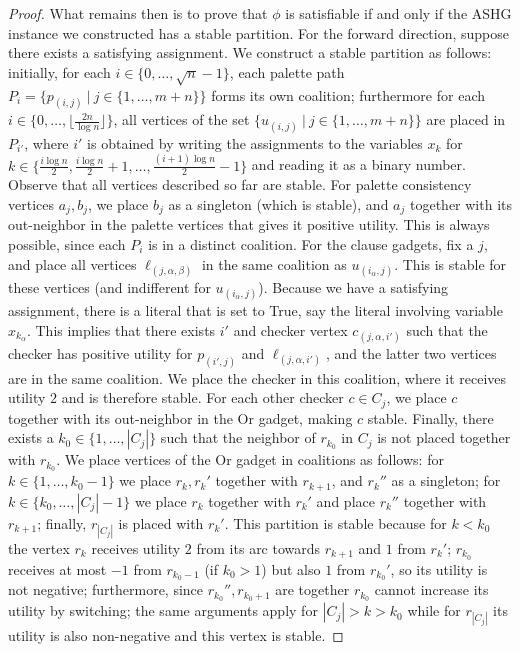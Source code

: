 \documentclass[letterpaper,USenglish,cleveref, autoref, thm-restate]{lipics-v2021}
\begin{document}
\begin{proof}
What remains then is to prove that $\phi$ is satisfiable if and only if the
ASHG instance we constructed has a stable partition. For the forward direction,
suppose there exists a satisfying assignment. We construct a stable partition
as follows: initially, for each $i\in\{0,\ldots,\sqrt{n}-1\}$, each palette
path $P_i = \{ p_{(i,j)}\ |\ j\in\{1,\ldots,m+n\}\}$ forms its own coalition;
furthermore for each $i\in\{0,\ldots,\lfloor\frac{2n}{\log n}\rfloor\}$, all
vertices of the set $\{ u_{(i,j)}\ |\ j\in\{1,\ldots,m+n\}\}$ are placed in
$P_{i'}$, where $i'$ is obtained by writing the assignments to the variables
$x_k$ for $k\in\{\frac{i\log n}{2}, \frac{i\log n}{2}+1,\ldots,\frac{(i+1)\log
n}{2}-1\}$ and reading it as a binary number. Observe that all vertices
described so far are stable. For palette consistency vertices $a_j,b_j$, we
place $b_j$ as a singleton (which is stable), and $a_j$ together with its
out-neighbor in the palette vertices that gives it positive utility. This is
always possible, since each $P_i$ is in a distinct coalition. For the clause
gadgets, fix a $j$, and place all vertices $\ell_{(j,\alpha,\beta)}$ in the
same coalition as $u_{(i_{\alpha},j)}$. This is stable for these vertices (and
indifferent for $u_{(i_{\alpha},j)}$). Because we have a satisfying assignment,
there is a literal that is set to True, say the literal involving variable
$x_{k_\alpha}$. This implies that there exists $i'$ and checker vertex
$c_{(j,\alpha,i')}$ such that the checker has positive utility for $p_{(i',j)}$
and $\ell_{(j,\alpha,i')}$, and the latter two vertices are in the same
coalition. We place the checker in this coalition, where it receives utility
$2$ and is therefore stable. For each other checker  $c\in C_j$, we place $c$
together with its out-neighbor in the Or gadget, making $c$ stable. Finally,
there exists a $k_0\in \{1,\ldots,|C_j|\}$ such that the neighbor of $r_{k_0}$
in $C_j$ is not placed together with $r_{k_0}$. We place vertices of the Or
gadget in coalitions as follows: for $k\in \{1,\ldots,k_0-1\}$ we place
$r_k,r_k'$ together with $r_{k+1}$, and $r_k''$ as a singleton; for
$k\in\{k_0,\ldots,|C_j|-1\}$ we place $r_k$ together with $r_k'$ and place
$r_k''$ together with $r_{k+1}$; finally, $r_{|C_j|}$ is placed with $r_k'$.
This partition is stable because for $k<k_0$ the vertex $r_k$ receives utility
$2$ from its arc towards $r_{k+1}$ and $1$ from $r_k'$; $r_{k_0}$ receives at
most $-1$ from $r_{k_0-1}$ (if $k_0>1$) but also $1$ from $r_{k_0}'$, so its
utility is not negative; furthermore, since $r_{k_0}'',r_{k_0+1}$ are together
$r_{k_0}$ cannot increase its utility by switching; the same arguments apply
for $|C_j|>k>k_0$ while for $r_{|C_j|}$ its utility is also non-negative and
this vertex is stable.


\end{proof}
\end{document}
